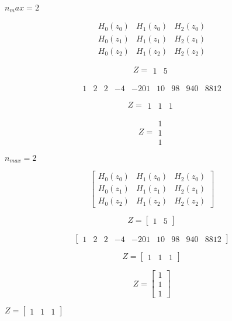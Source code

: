 \documentclass{article}
\begin{document}
$n_max=2$
\pagebreak

\[ \begin{matrix} H_0(z_0) & H_1(z_0) & H_2(z_0) \\ H_0(z_1) & H_1(z_1) & H_2(z_1) \\ H_0(z_2) & H_1(z_2) & H_2(z_2) \end{matrix} \]
\pagebreak

\[Z= \begin{matrix} 1 & 5 \end{matrix} \]
\pagebreak

\[ \begin{matrix} 1 & 2 & 2 & -4 & -20 1 & 10 & 98 & 940 & 8812 \end{matrix} \]
\pagebreak

\[ Z=\begin{matrix} 1 & 1 & 1 \end{matrix} \]
\pagebreak

\[ Z=\begin{matrix} 1 \\ 1 \\ 1 \end{matrix} \]
\pagebreak

$n_{max}=2$
\pagebreak

\[ \begin{bmatrix} H_0(z_0) & H_1(z_0) & H_2(z_0) \\ H_0(z_1) & H_1(z_1) & H_2(z_1) \\ H_0(z_2) & H_1(z_2) & H_2(z_2) \end{bmatrix} \]
\pagebreak

\[Z= \begin{bmatrix} 1 & 5 \end{bmatrix} \]
\pagebreak

\[ \begin{bmatrix} 1 & 2 & 2 & -4 & -20 1 & 10 & 98 & 940 & 8812 \end{bmatrix} \]
\pagebreak

\[ Z=\begin{bmatrix} 1 & 1 & 1 \end{bmatrix} \]
\pagebreak

\[ Z=\begin{bmatrix} 1 \\ 1 \\ 1 \end{bmatrix} \]
\pagebreak

$Z=\begin{bmatrix} 1 & 1 & 1 \end{bmatrix}$
\pagebreak
\end{document}
